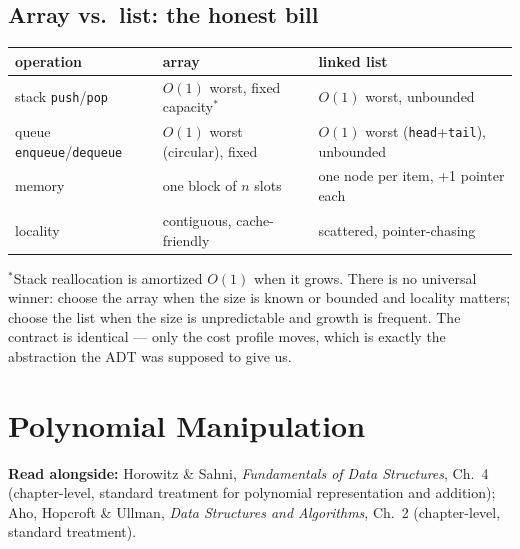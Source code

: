\documentclass[11pt]{article}
\begin{document}
\subsection{Array vs.\ list: the honest bill}

\begin{center}
{\footnotesize
\begin{tabular}{lll}
  \toprule
  \textbf{operation} & \textbf{array} & \textbf{linked list} \\
  \midrule
  stack \texttt{push}/\texttt{pop} & $O(1)$ worst, fixed capacity$^{*}$ & $O(1)$ worst, unbounded \\
  queue \texttt{enqueue}/\texttt{dequeue} & $O(1)$ worst (circular), fixed & $O(1)$ worst (\texttt{head}+\texttt{tail}), unbounded \\
  memory & one block of $n$ slots & one node per item, +1 pointer each \\
  locality & contiguous, cache-friendly & scattered, pointer-chasing \\
  \bottomrule
\end{tabular}}
\end{center}

\noindent $^{*}$Stack reallocation is amortized $O(1)$ when it grows. There is no universal winner: choose the array when the size is known or bounded and locality matters; choose the list when the size is unpredictable and growth is frequent. The contract is identical --- only the cost profile moves, which is exactly the abstraction the ADT was supposed to give us.


\section{Polynomial Manipulation}

\textbf{Read alongside:} Horowitz \& Sahni, \textit{Fundamentals of Data Structures}, Ch.~4 (chapter-level, standard treatment for polynomial representation and addition); Aho, Hopcroft \& Ullman, \textit{Data Structures and Algorithms}, Ch.~2 (chapter-level, standard treatment).
\end{document}
